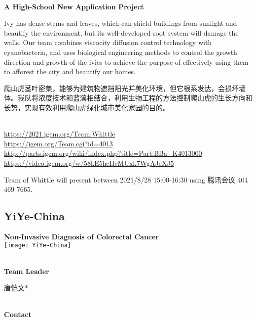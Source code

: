 \textbf{\\A High-School New Application Project\\}\begin{spacing}{1.5}

Ivy has dense stems and leaves, which can shield buildings from sunlight and beautify the environment, but its well-developed root system will damage the walls. Our team combines viscocity diffusion control technology with cyanobacteria, and uses biological engineering methods to control the growth direction and growth of the ivies to achieve the purpose of effectively using them to afforest the city and beautify our homes.

爬山虎茎叶密集，能够为建筑物遮挡阳光并美化环境，但它根系发达，会损坏墙体。我队将浓度技术和蓝藻相结合，利用生物工程的方法控制爬山虎的生长方向和长势，实现有效利用爬山虎绿化城市美化家园的目的。\end{spacing}
\\

\url{https://2021.igem.org/Team:Whittle }\\
\url{https://igem.org/Team.cgi?id=4013 }\\
\url{http://parts.igem.org/wiki/index.php?title=Part:BBa_K4013000 }\\
\url{https://video.igem.org/w/58kE5heHcMUxk7WgAJcXJ5 }\\

\vfill{}









Team of Whittle will present between       2021/8/28 15:00-16:30  using 腾讯会议 404 469 7665.
\newpage


\subsection{\textcolor{Blu}{ YiYe-China } }
\vspace{5mm}
\begin{center}
\large{
  \textbf{ Non-Invasive Diagnosis of Colorectal Cancer }\\

  \texttt{[image: YiYe-China]}
}
\end{center}
\textbf{\\Team Leader}

  唐恺文*


\textbf{\\Contact}

